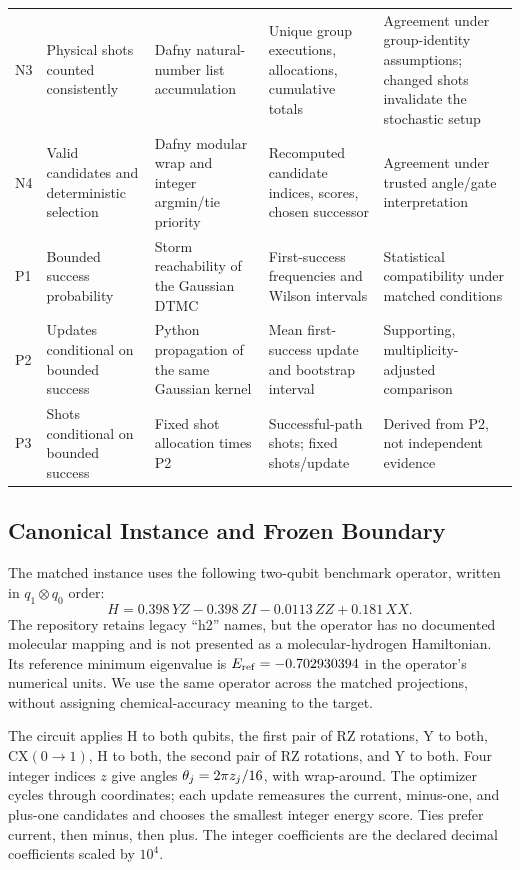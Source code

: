 \documentclass[conference]{IEEEtran}
\begin{document}
\begin{table}[!t]
\begin{tabularx}{\textwidth}{@{}p{}>{\raggedright\arraybackslash}p{}>{\raggedright\arraybackslash}p{}>{\raggedright\arraybackslash}p{}Y@{}}
N3 & Physical shots counted consistently & Dafny natural-number list accumulation & Unique group executions, allocations, cumulative totals & Agreement under group-identity assumptions; changed shots invalidate the stochastic setup \\
N4 & Valid candidates and deterministic selection & Dafny modular wrap and integer argmin/tie priority & Recomputed candidate indices, scores, chosen successor & Agreement under trusted angle/gate interpretation \\
P1 & Bounded success probability & Storm reachability of the Gaussian DTMC & First-success frequencies and Wilson intervals & Statistical compatibility under matched conditions \\
P2 & Updates conditional on bounded success & Python propagation of the same Gaussian kernel & Mean first-success update and bootstrap interval & Supporting, multiplicity-adjusted comparison \\
P3 & Shots conditional on bounded success & Fixed shot allocation times P2 & Successful-path shots; fixed shots/update & Derived from P2, not independent evidence \\
\bottomrule
\end{tabularx}
\end{table}

\subsection{Canonical Instance and Frozen Boundary}
\label{sec:canonical}
The matched instance uses the following two-qubit benchmark operator, written in $q_1\otimes q_0$ order:
\begin{equation}
 H=0.398\,YZ-0.398\,ZI-0.0113\,ZZ+0.181\,XX.
 \label{eq:hamiltonian}
\end{equation}
The repository retains legacy ``h2'' names, but the operator has no documented molecular mapping and is not presented as a molecular-hydrogen Hamiltonian. Its reference minimum eigenvalue is $E_{\rm ref}=-0.702930394$ in the operator's numerical units. We use the same operator across the matched projections, without assigning chemical-accuracy meaning to the target.

The circuit applies H to both qubits, the first pair of RZ rotations, Y to both, CX$(0\!\to\!1)$, H to both, the second pair of RZ rotations, and Y to both. Four integer indices $z$ give angles $\theta_j=2\pi z_j/16$, with wrap-around. The optimizer cycles through coordinates; each update remeasures the current, minus-one, and plus-one candidates and chooses the smallest integer energy score. Ties prefer current, then minus, then plus. The integer coefficients are the declared decimal coefficients scaled by $10^4$.
\end{document}
